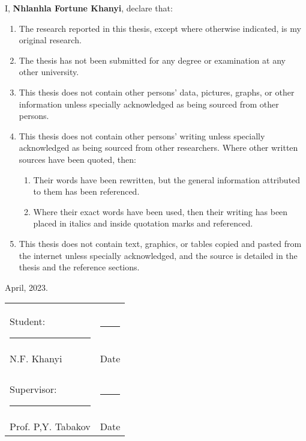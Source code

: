 I, \textbf{Nhlanhla Fortune Khanyi}, declare that:   

\begin{enumerate}
    \item The research reported in this thesis, except where otherwise indicated, is my original research. 
    \item The thesis has not been submitted for any degree or examination at any other university. 
    \item This thesis does not contain other persons' data, pictures, graphs, or other information unless specially acknowledged as being sourced from other persons.  
    \item This thesis does not contain other persons' writing unless specially acknowledged as being sourced from other researchers. Where other written sources have been quoted, then:  
    
    \begin{enumerate}
        \item Their words have been rewritten, but the general information attributed to them has been referenced.  
        \item Where their exact words have been used, then their writing has been placed in italics and inside quotation marks and referenced.  
    \end{enumerate} 
    
    \item This thesis does not contain text, graphics, or tables copied and pasted from the internet unless specially acknowledged, and the source is detailed in the thesis and the reference sections. 
\end{enumerate}

\begin{flushright}
April, 2023.
\end{flushright} 

\vspace{1cm}

\newcommand{\writingspace} {\rule{5cm}{0.2mm}}
{\renewcommand{\arraystretch}{1.6}

\begin{tabularx}{\textwidth}{ >{\hsize=1.3\hsize}X >{\hsize=0.5\hsize}X }
Student: \writingspace & \writingspace\\
N.F. Khanyi	& Date \\
\\
Supervisor: \writingspace & \writingspace\\
Prof. P,Y. Tabakov & Date 
\end{tabularx}}